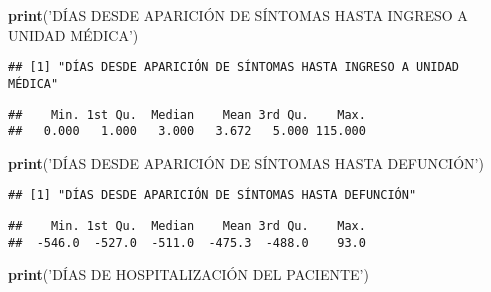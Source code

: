 \documentclass[]{article}
\newenvironment{Shaded}{\begin{snugshade}}{\end{snugshade}}
\newcommand{\KeywordTok}[1]{\textcolor[rgb]{0.13,0.29,0.53}{\textbf{#1}}}
\newcommand{\NormalTok}[1]{#1}
\newcommand{\OperatorTok}[1]{\textcolor[rgb]{0.81,0.36,0.00}{\textbf{#1}}}
\newcommand{\StringTok}[1]{\textcolor[rgb]{0.31,0.60,0.02}{#1}}
\begin{document}
\begin{Shaded}
\begin{Highlighting}[]
\KeywordTok{print}\NormalTok{(}\StringTok{'DÍAS DESDE APARICIÓN DE SÍNTOMAS HASTA INGRESO A UNIDAD MÉDICA'}\NormalTok{)}
\end{Highlighting}
\end{Shaded}

\begin{verbatim}
## [1] "DÍAS DESDE APARICIÓN DE SÍNTOMAS HASTA INGRESO A UNIDAD MÉDICA"
\end{verbatim}

\begin{Shaded}
\end{Shaded}

\begin{verbatim}
##    Min. 1st Qu.  Median    Mean 3rd Qu.    Max. 
##   0.000   1.000   3.000   3.672   5.000 115.000
\end{verbatim}

\begin{Shaded}
\begin{Highlighting}[]
\KeywordTok{print}\NormalTok{(}\StringTok{'DÍAS DESDE APARICIÓN DE SÍNTOMAS HASTA DEFUNCIÓN'}\NormalTok{)}
\end{Highlighting}
\end{Shaded}

\begin{verbatim}
## [1] "DÍAS DESDE APARICIÓN DE SÍNTOMAS HASTA DEFUNCIÓN"
\end{verbatim}

\begin{Shaded}
\end{Shaded}

\begin{verbatim}
##    Min. 1st Qu.  Median    Mean 3rd Qu.    Max. 
##  -546.0  -527.0  -511.0  -475.3  -488.0    93.0
\end{verbatim}

\begin{Shaded}
\begin{Highlighting}[]
\KeywordTok{print}\NormalTok{(}\StringTok{'DÍAS DE HOSPITALIZACIÓN DEL PACIENTE'}\NormalTok{)}
\end{Highlighting}
\end{Shaded}
\end{document}

